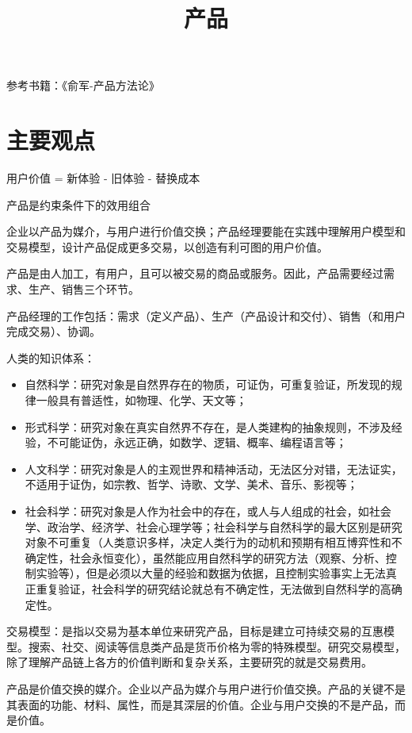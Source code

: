 \documentclass[12pt]{article}
\title{产品}
\begin{document}
\maketitle
\tableofcontents

参考书籍：《俞军-产品方法论》

\section{主要观点}
用户价值 = 新体验 - 旧体验 - 替换成本

产品是约束条件下的效用组合

企业以产品为媒介，与用户进行价值交换；产品经理要能在实践中理解用户模型和交易模型，设计产品促成更多交易，以创造有利可图的用户价值。

产品是由人加工，有用户，且可以被交易的商品或服务。因此，产品需要经过需求、生产、销售三个环节。

产品经理的工作包括：需求（定义产品）、生产（产品设计和交付）、销售（和用户完成交易）、协调。

人类的知识体系：
\begin{itemize}
\setlength{\itemsep}{0pt}
\setlength{\parsep}{0pt}
\setlength{\parskip}{0pt}
    \item 自然科学：研究对象是自然界存在的物质，可证伪，可重复验证，所发现的规律一般具有普适性，如物理、化学、天文等；
    \item 形式科学：研究对象在真实自然界不存在，是人类建构的抽象规则，不涉及经验，不可能证伪，永远正确，如数学、逻辑、概率、编程语言等；
    \item 人文科学：研究对象是人的主观世界和精神活动，无法区分对错，无法证实，不适用于证伪，如宗教、哲学、诗歌、文学、美术、音乐、影视等；
    \item 社会科学：研究对象是人作为社会中的存在，或人与人组成的社会，如社会学、政治学、经济学、社会心理学等；社会科学与自然科学的最大区别是研究对象不可重复（人类意识多样，决定人类行为的动机和预期有相互博弈性和不确定性，社会永恒变化），虽然能应用自然科学的研究方法（观察、分析、控制实验等），但是必须以大量的经验和数据为依据，且控制实验事实上无法真正重复验证，社会科学的研究结论就总有不确定性，无法做到自然科学的高确定性。
\end{itemize}

交易模型：是指以交易为基本单位来研究产品，目标是建立可持续交易的互惠模型。搜索、社交、阅读等信息类产品是货币价格为零的特殊模型。研究交易模型，除了理解产品链上各方的价值判断和复杂关系，主要研究的就是交易费用。

产品是价值交换的媒介。企业以产品为媒介与用户进行价值交换。产品的关键不是其表面的功能、材料、属性，而是其深层的价值。企业与用户交换的不是产品，而是价值。
\end{document}

